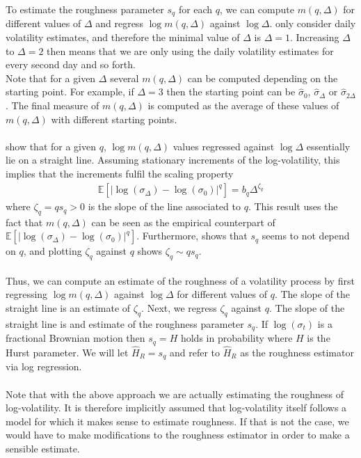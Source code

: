 \documentclass{article}
\begin{document}
To estimate the roughness parameter $s_q$ for each $q$, we can compute $m(q,\Delta)$ for different values of $\Delta$ and regress $\log m(q,\Delta)$ against $\log \Delta$. \cite{gatheral} only consider daily volatility estimates, and therefore the minimal value of $\Delta$ is $\Delta=1$. Increasing $\Delta$ to $\Delta=2$ then means that we are only using the daily volatility estimates for every second day and so forth.\\
Note that for a given $\Delta$ several $m(q,\Delta)$ can be computed depending on the starting point. For example, if $\Delta=3$ then the starting point can be $\hat{\sigma}_0$, $\hat{\sigma}_{\Delta}$ or $\hat{\sigma}_{2\Delta}$. The final measure of $m(q,\Delta)$ is computed as the average of these values of $m(q,\Delta)$ with different starting points.\\\\
\cite{gatheral} show that for a given $q$, $\log m(q,\Delta)$ values regressed against $\log \Delta$ essentially lie on a straight line. Assuming stationary increments of the log-volatility, this implies that the increments fulfil the scaling property 
\begin{align*}
\mathbb{E}\left[ \lvert \log (\sigma_\Delta) - \log (\sigma_0) \rvert^q\right] = b_q\Delta^{\zeta _q}
\end{align*}
where $\zeta_q = qs_q>0$ is the slope of the line associated to $q$. This result uses the fact that $m(q,\Delta)$ can be seen as the empirical counterpart of $\mathbb{E}\left[ \lvert \log (\sigma_\Delta) - \log (\sigma_0) \rvert^q\right]$. Furthermore, \cite{gatheral} shows that $s_q$ seems to not depend on $q$, and plotting $\zeta_q$ against $q$ shows $\zeta_q \sim qs_q$.\\\\
Thus, we can compute an estimate of the roughness of a volatility process by first regressing $\log m(q,\Delta)$ against $\log \Delta$ for different values of $q$. The slope of the straight line is an estimate of $\zeta_q$. Next, we regress $\zeta_q$ against $q$. The slope of the straight line is and estimate of the roughness parameter $s_q$. If $\log(\sigma_t)$ is a fractional Brownian motion then $s_q=H$ holds in probability where $H$ is the Hurst parameter. We will let $\widehat{H}_R = s_q$ and refer to $\widehat{H}_R$ as the roughness estimator via log regression.\\\\
Note that with the above approach we are actually estimating the roughness of log-volatility. It is therefore implicitly assumed that log-volatility itself follows a model for which it makes sense to estimate roughness. If that is not the case, we would have to make modifications to the roughness estimator in order to make a sensible estimate. \\
\end{document}
